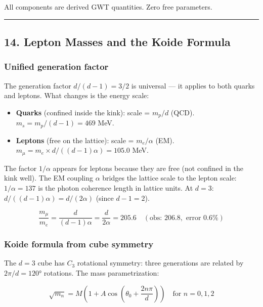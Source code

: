\documentclass[
]{article}
\providecommand{\tightlist}{%
  \setlength{\itemsep}{0pt}\setlength{\parskip}{0pt}}
\begin{document}
All components are derived GWT quantities. Zero free parameters.

\begin{center}\rule{0.5\linewidth}{0.5pt}\end{center}

\subsection{14. Lepton Masses and the Koide
Formula}\label{lepton-masses-and-the-koide-formula}

\subsubsection{Unified generation
factor}\label{unified-generation-factor}

The generation factor \(d/(d\!-\!1) = 3/2\) is universal --- it applies
to both quarks and leptons. What changes is the energy scale:

\begin{itemize}
\tightlist
\item
  \textbf{Quarks} (confined inside the kink): scale = \(m_p/d\) (QCD).
  \(m_s = m_p/(d\!-\!1) = 469\) MeV.
\item
  \textbf{Leptons} (free on the lattice): scale = \(m_e/\alpha\) (EM).
  \(m_\mu = m_e \times d/((d\!-\!1)\alpha) = 105.0\) MeV.
\end{itemize}

The factor \(1/\alpha\) appears for leptons because they are free (not
confined in the kink well). The EM coupling \(\alpha\) bridges the
lattice scale to the lepton scale: \(1/\alpha = 137\) is the photon
coherence length in lattice units. At \(d = 3\):
\(d/((d\!-\!1)\alpha) = d/(2\alpha)\) (since \(d\!-\!1 = 2\)).

\[\frac{m_\mu}{m_e} = \frac{d}{(d-1)\alpha} = \frac{d}{2\alpha} = 205.6 \quad (\text{obs: } 206.8, \text{ error } 0.6\%)\]

\subsubsection{Koide formula from cube
symmetry}\label{koide-formula-from-cube-symmetry}

The \(d = 3\) cube has \(C_3\) rotational symmetry: three generations
are related by \(2\pi/d = 120°\) rotations. The mass parametrization:

\[\sqrt{m_n} = M\left(1 + A\cos\left(\theta_0 + \frac{2n\pi}{d}\right)\right) \quad \text{for } n = 0, 1, 2\]
\end{document}
